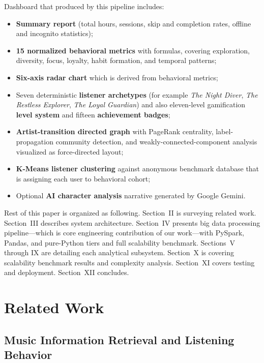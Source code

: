 \documentclass[conference]{IEEEtran}
\begin{document}
Dashboard that produced by this pipeline includes:
\begin{itemize}
  \item \textbf{Summary report} (total hours, sessions, skip and completion
        rates, offline and incognito statistics);
  \item \textbf{15 normalized behavioral metrics} with formulas, covering
        exploration, diversity, focus, loyalty, habit formation, and temporal
        patterns;
  \item \textbf{Six-axis radar chart} which is derived from behavioral metrics;
  \item Seven deterministic \textbf{listener archetypes} (for example \textit{The
        Night Diver}, \textit{The Restless Explorer}, \textit{The Loyal
        Guardian}) and also eleven-level gamification \textbf{level system} and
        fifteen \textbf{achievement badges};
  \item \textbf{Artist-transition directed graph} with PageRank centrality,
        label-propagation community detection, and weakly-connected-component
        analysis visualized as force-directed layout;
  \item \textbf{K-Means listener clustering} against anonymous benchmark
        database that is assigning each user to behavioral cohort;
  \item Optional \textbf{AI character analysis} narrative generated by
        Google Gemini.
\end{itemize}

Rest of this paper is organized as following. Section~II is surveying related work. Section~III describes system architecture. Section~IV presents big data processing pipeline---which is core engineering contribution of our work---with PySpark, Pandas, and pure-Python tiers and full scalability benchmark. Sections~V through IX are detailing each analytical subsystem. Section~X is covering scalability benchmark results and complexity analysis. Section~XI covers testing and deployment. Section~XII concludes.

\section{Related Work}

\subsection{Music Information Retrieval and Listening Behavior}
\end{document}
